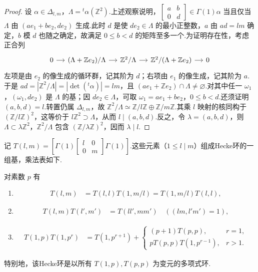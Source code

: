 \begin{proof}
设 $\alpha\in\Delta_{l,m}$，$\Lambda={}^t\alpha(\mathbb Z^2)$.上述观察说明，$\left[\begin{smallmatrix}a&b\\0&d\end{smallmatrix}\right]\in\Gamma(1)\alpha$ 当且仅当 $\Lambda$ 由 $(ae_1+be_2,de_2)$ 生成.此时 $d$ 是使 $de_2\in\Lambda$ 的最小正整数，$a$ 由 $ad=lm$ 确定，$b$ 模 $d$ 也随之确定，故满足 $0\le b<d$ 的矩阵至多一个.为证明存在性，考虑正合列
\[
\begin{tikzcd}[column sep=small]
0 \arrow[r] & (\Lambda+\mathbb Ze_2)/\Lambda \arrow[r] & \mathbb Z^2/\Lambda \arrow[r] & \mathbb Z^2/(\Lambda+\mathbb Ze_2) \arrow[r] & 0
\end{tikzcd}
\]
左项是由 $e_2$ 的像生成的循环群，记其阶为 $d$；右项由 $e_1$ 的像生成，记其阶为 $a$.于是 $ad=|\mathbb Z^2/\Lambda|=|\det({}^t\alpha)|=lm$，且 $(ae_1+\mathbb Ze_2)\cap\Lambda\ne\varnothing$.对其中任一 $\omega_1$，$(\omega_1,de_2)$ 是 $\Lambda$ 的基；因 $de_2\in\Lambda$，可取 $\omega_1=ae_1+be_2$，$0\le b<d$.还须证明 $(a,b,d)=l$.转置仍属 $\Delta_{l,m}$，故 $\mathbb Z^2/\Lambda\simeq\mathbb Z/l\mathbb Z\oplus\mathbb Z/m\mathbb Z$.其乘 $l$ 映射的核同构于 $(\mathbb Z/l\mathbb Z)^2$，这等价于 $l\mathbb Z^2\supset\Lambda$，从而 $l\mid(a,b,d)$.反之，令 $\lambda=(a,b,d)$，则 $\Lambda\subset\lambda\mathbb Z^2$，$\mathbb Z^2/\Lambda$ 包含 $(\mathbb Z/\lambda\mathbb Z)^2$，因而 $\lambda\mid l$.

\end{proof}

记 $T(l,m)=[\Gamma(1)\left[\begin{smallmatrix}l&0\\0&m\end{smallmatrix}\right]\Gamma(1)]$.这些元素（$1\le l\mid m$）组成Hecke环的一组基，乘法表如下.

\begin{proposition*}

对素数 $p$ 有

\begin{enumerate}[label=\roman*)]
\item
\begin{align*}
T(l,m)&=T(l,l)T(1,m/l)=T(1,m/l)T(l,l),
\end{align*}
\item
\begin{align*}
T(l,m)T(l',m')&=T(ll',mm')\quad((lm,l'm')=1),
\end{align*}
\item
\begin{align*}
T(1,p)T(1,p^r)&=T(1,p^{r+1})+\begin{cases}(p+1)T(p,p),&r=1,\\pT(p,p)T(1,p^{r-1}),&r>1.\end{cases}
\end{align*}
\end{enumerate}

特别地，该Hecke环是以所有 $T(1,p),T(p,p)$ 为变元的多项式环.

\end{proposition*}

